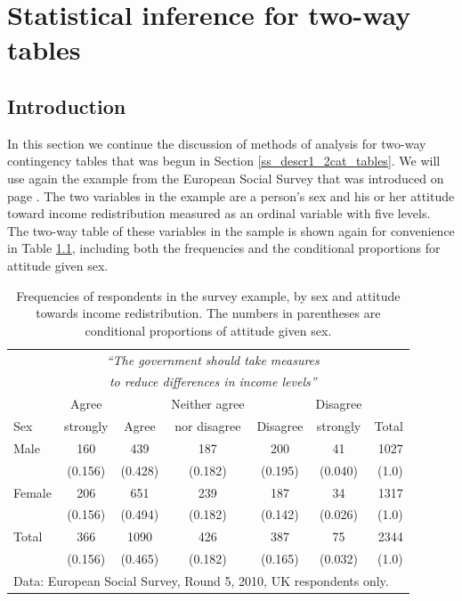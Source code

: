 \chapter{Statistical
inference for two-way tables}
\label{c_tables}

\section{Introduction}
\label{s_tables_intro}

In this section we continue the discussion of methods of analysis for
two-way contingency tables that was begun in Section
\ref{ss_descr1_2cat_tables}. We will use again the example from the
European Social Survey that was introduced on page
\pageref{p_ess_example}. The two variables in the example are a person's
sex and his or her attitude toward income redistribution measured as an
ordinal variable with five levels. The two-way table of
these variables in the sample is shown again for convenience in Table
\ref{t_sex_attitude_ch4}, including both the frequencies and the conditional
proportions for attitude given sex.

\begin{table}
\caption{Frequencies of respondents in the survey example,
by sex and attitude towards income redistribution. The numbers in
parentheses are conditional proportions
of attitude given sex.}
\label{t_sex_attitude_ch4}
\begin{center}
\begin{tabular}{|l|ccccc|r|}\hline
& \multicolumn{5}{|c|}{\emph{``The government should
take measures}} & \\
& \multicolumn{5}{|c|}{\emph{to reduce differences in income levels''}}
& \\[.3ex]
 & Agree & & Neither agree & & Disagree & \\
Sex & strongly & Agree & nor disagree & Disagree & strongly & Total \\ \hline
Male &  160& 439 & 187 &200  & 41 & 1027 \\
& (0.156) & (0.428) & (0.182) & (0.195) & (0.040) & (1.0) \\
Female & 206 & 651 & 239 & 187 & 34 & 1317\\
& (0.156) & (0.494) & (0.182) & (0.142) & (0.026) & (1.0) \\
\hline
Total & 366 & 1090 & 426 & 387 & 75 & 2344 \\
 & (0.156) & (0.465) & (0.182) & (0.165)& (0.032) & (1.0) \\
\hline
\multicolumn{7}{l}{\scriptsize Data: European Social Survey, Round 5,
2010, UK respondents only.}
\end{tabular}
\end{center}
\vspace*{-3ex}
\end{table}

